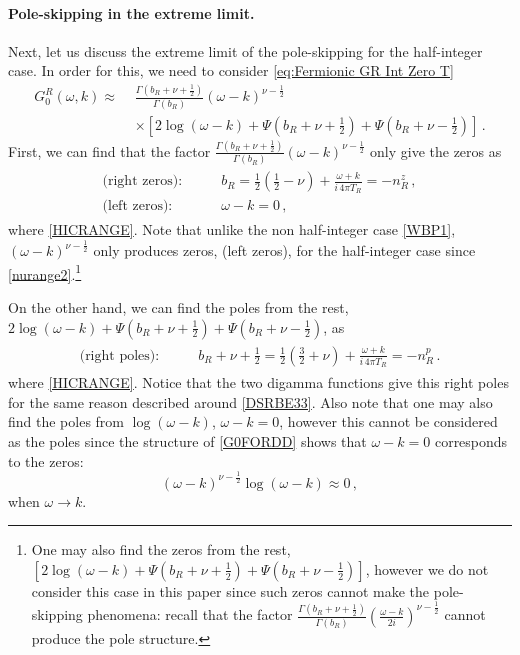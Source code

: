\documentclass[11pt,a4paper]{article}
\begin{document}
\paragraph{Pole-skipping in the extreme limit.}
Next, let us discuss the extreme limit of the pole-skipping for the half-integer case.
In order for this, we need to consider \eqref{eq:Fermionic GR Int Zero T}
\begin{equation}\label{G0FORDD}
\begin{split}
    G^R_{0} (\omega, k)  \approx \,\, & \frac{\Gamma({b}_R+\nu+\frac{1}{2})}{\Gamma({b}_R)} \left( \omega-k \right)^{\nu-\frac{1}{2}} \\
     & \times \left[ 2 \log (\omega-k) +\Psi\left({b}_R+\nu+\frac{1}{2}\right) +\Psi\left({b}_R+\nu-\frac{1}{2}\right) \right]\,.
\end{split}
\end{equation}
First, we can find that the factor $\frac{\Gamma({b}_R+\nu+\frac{1}{2})}{\Gamma({b}_R)} \left( \omega-k \right)^{\nu-\frac{1}{2}}$ only give the zeros as
\begin{align}
\begin{split}
    \text{(right zeros):} \qquad & {b}_R = \frac{1}{2}\left(\frac{1}{2} - \nu \right) +\frac{\omega+k}{ i\, 4 \pi T_R} = - n^z_R\,, \\
    \text{(left zeros):} \qquad & \omega - k = 0\,,
\end{split}
\end{align}
where \eqref{HICRANGE}.
Note that unlike the non half-integer case \eqref{WBP1}, 
$\left( \omega-k \right)^{\nu-\frac{1}{2}}$ only produces zeros, (left zeros), for the half-integer case since \eqref{nurange2}.\footnote{One may also find the zeros from the rest, $\left[ 2 \log (\omega-k) +\Psi\left({b}_R+\nu+\frac{1}{2}\right) +\Psi\left({b}_R+\nu-\frac{1}{2}\right) \right]$, however we do not consider this case in this paper since such zeros cannot make the pole-skipping phenomena: recall that the factor $\frac{\Gamma({b}_R+\nu+\frac{1}{2})}{\Gamma({b}_R)} \left( \frac{\omega-k}{2 i} \right)^{\nu-\frac{1}{2}}$ cannot produce the pole structure.}

On the other hand, we can find the poles from the rest, $2 \log (\omega-k) +\Psi\left({b}_R+\nu+\frac{1}{2}\right) +\Psi\left({b}_R+\nu-\frac{1}{2}\right)$, as
\begin{align}\label{PEL}
\begin{split}
    \text{(right poles):} \qquad & {b}_R+\nu+\frac{1}{2} = \frac{1}{2}\left( \frac{3}{2} + \nu \right) + \frac{\omega+k}{i\, 4 \pi T_R} = - n^p_R\,.
\end{split}
\end{align}
where \eqref{HICRANGE}.
Notice that the two digamma functions give this right poles for the same reason described around \eqref{DSRBE33}.
Also note that one may also find the poles from $\log (\omega-k)$, $\omega-k=0$, however this cannot be considered as the poles since the structure of \eqref{G0FORDD} shows that $\omega-k=0$ corresponds to the zeros: 
\begin{equation}\label{}
\left( \omega-k \right)^{\nu-\frac{1}{2}}\log (\omega-k) \approx 0  \,,
\end{equation}
when $\omega \rightarrow k$.\\
\end{document}
